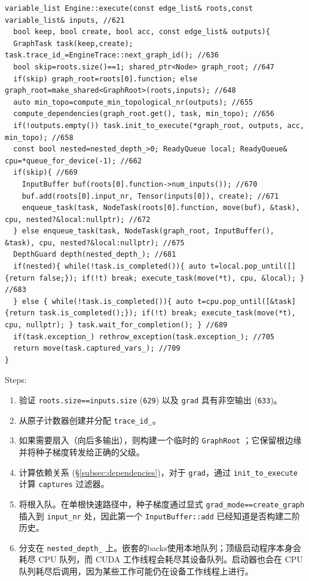 \begin{lstlisting}[caption={orchestration.}, label=lst:execute]
variable_list Engine::execute(const edge_list& roots,const variable_list& inputs, //621
  bool keep, bool create, bool acc, const edge_list& outputs){
  GraphTask task(keep,create); task.trace_id_=EngineTrace::next_graph_id(); //636
  bool skip=roots.size()==1; shared_ptr<Node> graph_root; //647
  if(skip) graph_root=roots[0].function; else graph_root=make_shared<GraphRoot>(roots,inputs); //648
  auto min_topo=compute_min_topological_nr(outputs); //655
  compute_dependencies(graph_root.get(), task, min_topo); //656
  if(!outputs.empty()) task.init_to_execute(*graph_root, outputs, acc, min_topo); //658
  const bool nested=nested_depth_>0; ReadyQueue local; ReadyQueue& cpu=*queue_for_device(-1); //662
  if(skip){ //669
    InputBuffer buf(roots[0].function->num_inputs()); //670
    buf.add(roots[0].input_nr, Tensor(inputs[0]), create); //671
    enqueue_task(task, NodeTask(roots[0].function, move(buf), &task), cpu, nested?&local:nullptr); //672
  } else enqueue_task(task, NodeTask(graph_root, InputBuffer(), &task), cpu, nested?&local:nullptr); //675
  DepthGuard depth(nested_depth_); //681
  if(nested){ while(!task.is_completed()){ auto t=local.pop_until([]{return false;}); if(!t) break; execute_task(move(*t), cpu, &local); } //683
  } else { while(!task.is_completed()){ auto t=cpu.pop_until([&task]{return task.is_completed();}); if(!t) break; execute_task(move(*t), cpu, nullptr); } task.wait_for_completion(); } //689
  if(task.exception_) rethrow_exception(task.exception_); //705
  return move(task.captured_vars_); //709
}
\end{lstlisting}

Steps:

\begin{enumerate}[leftmargin=1.2em]
\item 验证 \texttt{roots.size==inputs.size} (\texttt{629}) 以及 \texttt{grad} 具有非空输出 (\texttt{633})。
\item 从原子计数器创建并分配 \texttt{trace\_id\_}。
\item 如果需要扇入（向后多输出），则构建一个临时的 \texttt{GraphRoot} ；它保留根边缘并将种子梯度转发给正确的父级。
\item 计算依赖关系 (\S\ref{subsec:dependencies})，对于 \texttt{grad}，通过 \texttt{init\_to\_execute} 计算 \texttt{captures} 过滤器。
\item 将根入队。在单根快速路径中，种子梯度通过显式 \texttt{grad\_mode==create\_graph} 插入到 \texttt{input\_nr} 处，因此第一个 \texttt{InputBuffer::add} 已经知道是否构建二阶历史。
\item 分支在 \texttt{nested\_depth\_} 上。嵌套的backs使用本地队列；顶级启动程序本身会耗尽 CPU 队列，而 CUDA 工作线程会耗尽其设备队列。启动器也会在 CPU 队列耗尽后调用，因为某些工作可能仍在设备工作线程上进行。
\end{enumerate}

